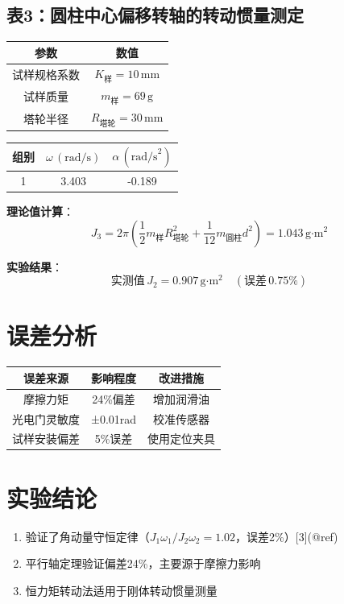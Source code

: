 \documentclass[12pt,a4paper]{article}
\begin{document}
\subsection{表3：圆柱中心偏移转轴的转动惯量测定}
\begin{table}[H]
\centering
\begin{tabular}{|c|c|}
\hline
参数 & 数值 \\
\hline
试样规格系数 & $K_{\text{样}} = 10\,\text{mm}$ \\
\hline
试样质量 & $m_{\text{样}} = 69\,\text{g}$ \\
\hline
塔轮半径 & $R_{\text{塔轮}} = 30\,\text{mm}$ \\
\hline
\end{tabular}
\end{table}

\begin{table}[H]
\centering
\begin{tabular}{|c|c|c|}
\hline
组别 & $\omega\,(\text{rad/s})$ & $\alpha\,(\text{rad/s}^2)$ \\
\hline
1 & 3.403 & -0.189 \\
\hline
\end{tabular}
\end{table}

\textbf{理论值计算}：
\begin{equation}
J_3 = 2\pi\left( \frac{1}{2}m_{\text{样}}R_{\text{塔轮}}^2 + \frac{1}{12}m_{\text{圆柱}}d^2 \right) = 1.043\,\text{g·m}^2
\end{equation}

\textbf{实验结果}：
\begin{equation}
\text{实测值}\,J_2 = 0.907\,\text{g·m}^2 \quad (\text{误差}\,0.75\%)
\end{equation}

\section{误差分析}
\begin{table}[H]
\centering
\begin{tabular}{|c|c|c|}
\hline
误差来源 & 影响程度 & 改进措施 \\
\hline
摩擦力矩 & 24\%偏差 & 增加润滑油 \\
\hline
光电门灵敏度 & ±0.01rad & 校准传感器 \\
\hline
试样安装偏差 & 5\%误差 & 使用定位夹具 \\
\hline
\end{tabular}
\end{table}

\section{实验结论}
\begin{enumerate}
\item 验证了角动量守恒定律（$J_1\omega_1/J_2\omega_2=1.02$，误差2\%）[3](@ref)
\item 平行轴定理验证偏差24\%，主要源于摩擦力影响
\item 恒力矩转动法适用于刚体转动惯量测量
\end{enumerate}
\end{document}
